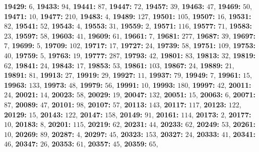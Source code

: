 \textsf{\bfseries 19429:} $6$, \textsf{\bfseries 19433:} $94$, \textsf{\bfseries 19441:} $87$, \textsf{\bfseries 19447:} $72$, \textsf{\bfseries 19457:} $39$, \textsf{\bfseries 19463:} $47$, \textsf{\bfseries 19469:} $50$, \textsf{\bfseries 19471:} $10$, \textsf{\bfseries 19477:} $210$, \textsf{\bfseries 19483:} $4$, \textsf{\bfseries 19489:} $127$, \textsf{\bfseries 19501:} $105$, \textsf{\bfseries 19507:} $16$, \textsf{\bfseries 19531:} $82$, \textsf{\bfseries 19541:} $52$, \textsf{\bfseries 19543:} $4$, \textsf{\bfseries 19553:} $31$, \textsf{\bfseries 19559:} $2$, \textsf{\bfseries 19571:} $116$, \textsf{\bfseries 19577:} $71$, \textsf{\bfseries 19583:} $23$, \textsf{\bfseries 19597:} $58$, \textsf{\bfseries 19603:} $41$, \textsf{\bfseries 19609:} $61$, \textsf{\bfseries 19661:} $7$, \textsf{\bfseries 19681:} $277$, \textsf{\bfseries 19687:} $39$, \textsf{\bfseries 19697:} $7$, \textsf{\bfseries 19699:} $5$, \textsf{\bfseries 19709:} $102$, \textsf{\bfseries 19717:} $17$, \textsf{\bfseries 19727:} $24$, \textsf{\bfseries 19739:} $58$, \textsf{\bfseries 19751:} $109$, \textsf{\bfseries 19753:} $40$, \textsf{\bfseries 19759:} $5$, \textsf{\bfseries 19763:} $19$, \textsf{\bfseries 19777:} $287$, \textsf{\bfseries 19793:} $42$, \textsf{\bfseries 19801:} $83$, \textsf{\bfseries 19813:} $32$, \textsf{\bfseries 19819:} $62$, \textsf{\bfseries 19841:} $24$, \textsf{\bfseries 19843:} $17$, \textsf{\bfseries 19853:} $53$, \textsf{\bfseries 19861:} $103$, \textsf{\bfseries 19867:} $24$, \textsf{\bfseries 19889:} $21$, \textsf{\bfseries 19891:} $81$, \textsf{\bfseries 19913:} $27$, \textsf{\bfseries 19919:} $29$, \textsf{\bfseries 19927:} $11$, \textsf{\bfseries 19937:} $79$, \textsf{\bfseries 19949:} $7$, \textsf{\bfseries 19961:} $15$, \textsf{\bfseries 19963:} $133$, \textsf{\bfseries 19973:} $48$, \textsf{\bfseries 19979:} $56$, \textsf{\bfseries 19991:} $10$, \textsf{\bfseries 19993:} $180$, \textsf{\bfseries 19997:} $42$, \textsf{\bfseries 20011:} $24$, \textsf{\bfseries 20021:} $14$, \textsf{\bfseries 20023:} $58$, \textsf{\bfseries 20029:} $19$, \textsf{\bfseries 20047:} $132$, \textsf{\bfseries 20051:} $15$, \textsf{\bfseries 20063:} $6$, \textsf{\bfseries 20071:} $87$, \textsf{\bfseries 20089:} $47$, \textsf{\bfseries 20101:} $98$, \textsf{\bfseries 20107:} $57$, \textsf{\bfseries 20113:} $143$, \textsf{\bfseries 20117:} $117$, \textsf{\bfseries 20123:} $122$, \textsf{\bfseries 20129:} $15$, \textsf{\bfseries 20143:} $122$, \textsf{\bfseries 20147:} $158$, \textsf{\bfseries 20149:} $91$, \textsf{\bfseries 20161:} $114$, \textsf{\bfseries 20173:} $2$, \textsf{\bfseries 20177:} $10$, \textsf{\bfseries 20183:} $8$, \textsf{\bfseries 20201:} $115$, \textsf{\bfseries 20219:} $62$, \textsf{\bfseries 20231:} $44$, \textsf{\bfseries 20233:} $62$, \textsf{\bfseries 20249:} $53$, \textsf{\bfseries 20261:} $10$, \textsf{\bfseries 20269:} $89$, \textsf{\bfseries 20287:} $4$, \textsf{\bfseries 20297:} $45$, \textsf{\bfseries 20323:} $153$, \textsf{\bfseries 20327:} $24$, \textsf{\bfseries 20333:} $41$, \textsf{\bfseries 20341:} $46$, \textsf{\bfseries 20347:} $26$, \textsf{\bfseries 20353:} $61$, \textsf{\bfseries 20357:} $45$, \textsf{\bfseries 20359:} $65$, 
